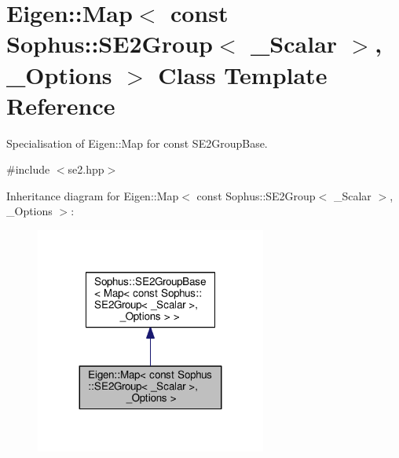 \hypertarget{class_eigen_1_1_map_3_01const_01_sophus_1_1_s_e2_group_3_01___scalar_01_4_00_01___options_01_4}{}\section{Eigen\+:\+:Map$<$ const Sophus\+:\+:S\+E2\+Group$<$ \+\_\+\+Scalar $>$, \+\_\+\+Options $>$ Class Template Reference}
\label{class_eigen_1_1_map_3_01const_01_sophus_1_1_s_e2_group_3_01___scalar_01_4_00_01___options_01_4}


Specialisation of Eigen\+::\+Map for const S\+E2\+Group\+Base.  




{\ttfamily \#include $<$se2.\+hpp$>$}



Inheritance diagram for Eigen\+:\+:Map$<$ const Sophus\+:\+:S\+E2\+Group$<$ \+\_\+\+Scalar $>$, \+\_\+\+Options $>$\+:
\nopagebreak
\begin{figure}[H]
\begin{center}
\leavevmode
\includegraphics[width=215pt]{class_eigen_1_1_map_3_01const_01_sophus_1_1_s_e2_group_3_01___scalar_01_4_00_01___options_01_4__inherit__graph}
\end{center}
\end{figure}


